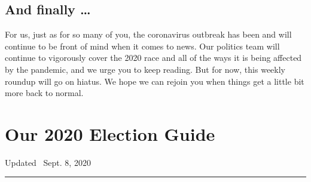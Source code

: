 \hypertarget{and-finally-}{%
\subsection{And finally \ldots{}}\label{and-finally-}}

For us, just as for so many of you, the coronavirus outbreak has been
and will continue to be front of mind when it comes to news. Our
politics team will continue to vigorously cover the 2020 race and all of
the ways it is being affected by the pandemic, and we urge you to keep
reading. But for now, this weekly roundup will go on hiatus. We hope we
can rejoin you when things get a little bit more back to normal.

\hypertarget{our-2020-election-guide}{%
\section{Our 2020 Election Guide}\label{our-2020-election-guide}}

Updated ~Sept. 8, 2020

\begin{center}\rule{0.5\linewidth}{\linethickness}\end{center}

